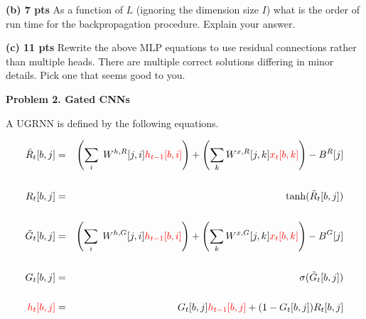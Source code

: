 \documentclass{article}
\newcommand{\solution}[1]{}
\begin{document}
\solution{
  SGD on deep networks with the loss term only occuring at the final layer is not generally effective because the lower layers
  never get meaninful gradients.  Placing loss functions near the lower layers will cause the lower hidden layers to have meaningful
  gradients and produce informative features.
}

\medskip
{\bf (b) 7 pts} As a function of $L$ (ignoring the dimension size $I$) what is the order of run time for the backpropagation procedure.
Explain your answer.

\solution{It is $O(L)$ --- linear in $L$.  Backpropagation loops over the assignments of the program and takes time proportional to the size of the program.
  Back-propagation over the final sum of losses produces a gradient for each prediction $\hat{y}_\ell$ which can be used as we back-propagate over the
  earlier assignments.
}

\medskip
{\bf (c) 11 pts} Rewrite the above MLP equations to use residual connections rather than multiple heads.  There are multiple correct solutions differing in minor details.  Pick one that seems
good to you.

\solution{
\begin{eqnarray*}
  h_0[i] & = & x[i] \\
  & \vdots & \\
  \tilde{h}_{\ell+1}[i] & = & \sigma(W^{h,h}_{\ell+1}[i,I]h_\ell[I] - B^{h,h}_{\ell+1}[i]) \\
  h_{\ell+1}[i] & = & \tilde{h}_{\ell+1}[i] + h_\ell[i] \\
  & \vdots & \\
  \hat{y} & = & W^{h,y}[I]h_L[I]- B^{h,y} \\
  \mathrm{Loss} & = & (y - \hat{y})^2
\end{eqnarray*}
}

\medskip
{\bf Problem 2. Gated CNNs}

A UGRNN is defined by the following equations.

\begin{eqnarray*}
\tilde{R}_t[b,j] & = & \left(\sum_i\;W^{h,R}[j,i]{\color{red} h_{t-1}[b,i]}\right) + \left(\sum_k W^{x,R}[j,k]{\color{red} x_t[b,k]}\right) - B^R[j] \\
\\
R_t[b,j] & = & \mathrm{\tanh}(\tilde{R}_t[b,j]) \\
\\
\tilde{G}_t[b,j] & = & \left(\sum_i\;W^{h,G}[j,i]{\color{red} h_{t-1}[b,i]}\right) + \left(\sum_k W^{x,G}[j,k]{\color{red} x_t[b,k]}\right) - B^G[j] \\
\\
G_t[b,j] & = & \mathrm{\sigma}(\tilde{G}_t[b,j]) \\
\\
{\color{red} h_t[b,j]} & = & G_t[b,j]{\color{red} h_{t-1}[b,j]} + (1-G_t[b,j])R_t[b,j]
\end{eqnarray*}
\end{document}
